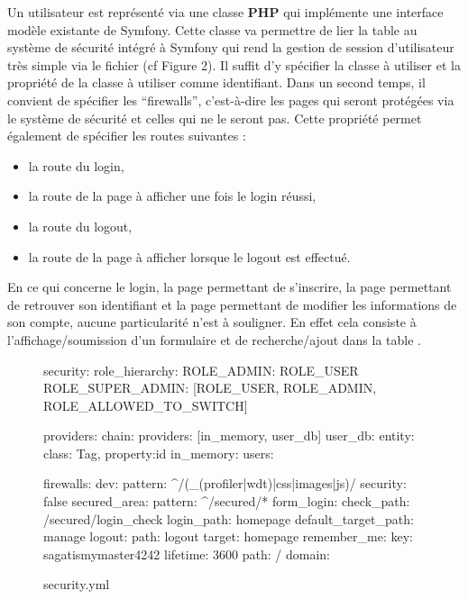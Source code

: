 \documentclass{article}
\begin{document}
\begin{sffamily}
Un utilisateur est représenté via une classe \textbf{PHP} qui implémente une interface modèle existante de Symfony. Cette classe va permettre de lier la table  au 
système de sécurité intégré à Symfony qui rend la gestion de session d'utilisateur très simple via le fichier  (cf Figure 2). Il suffit d'y 
spécifier la classe à utiliser et la propriété de la classe à utiliser comme identifiant. Dans un second temps, il convient de spécifier les ``firewalls'', c'est-à-dire les 
pages qui seront protégées via le système de sécurité et celles qui ne le seront pas. Cette propriété permet également de spécifier les routes suivantes :
\begin{itemize}
\item{la route du login},
\item{la route de la page à afficher une fois le login réussi},
\item{la route du logout},
\item{la route de la page à afficher lorsque le logout est effectué}.
\end{itemize}

\noindent En ce qui concerne le login, la page permettant de s'inscrire, la page permettant de retrouver son identifiant et la page permettant de modifier les informations 
de son compte, aucune particularité n'est à souligner. En effet cela consiste à l'affichage/soumission d'un formulaire et de recherche/ajout dans la table
.

\begin{figure}[h!]
	\begin{boxedverbatim}
security:
    role_hierarchy:
        ROLE_ADMIN:       ROLE_USER
        ROLE_SUPER_ADMIN: [ROLE_USER, ROLE_ADMIN, ROLE_ALLOWED_TO_SWITCH]

    providers:
        chain:
            providers: [in_memory, user_db]
        user_db:
            entity: {class: Tag\ConnectBundle\Entity\User, property:id }
        in_memory:
            users:

    firewalls:
        dev:
            pattern:  ^/(_(profiler|wdt)|css|images|js)/
            security: false
        secured_area:
            pattern: ^/secured/*
            form_login:
                check_path: /secured/login_check
                login_path: homepage
                default_target_path: manage
            logout:
                path: logout
                target: homepage
            remember_me:
                key:  sagatismymaster4242
                lifetime: 3600
                path: /
                domain: ~
	\end{boxedverbatim}
	\label{security}
	\caption{security.yml}
\end{figure}


\end{sffamily}
\end{document}
